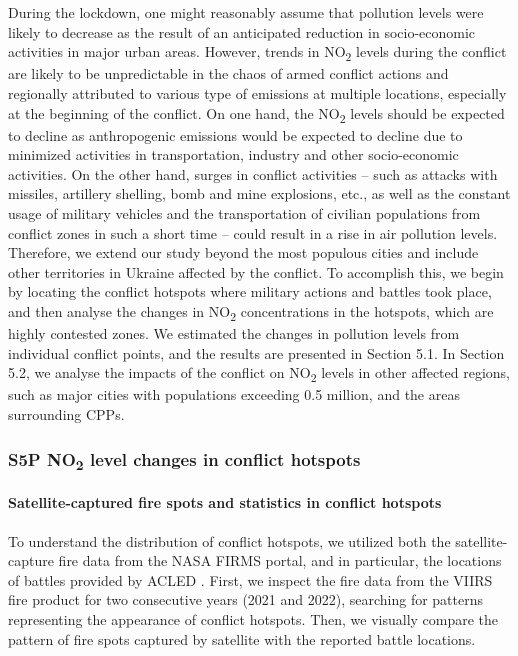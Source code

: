 During the lockdown, one might reasonably assume that pollution levels were likely to decrease as the result of an anticipated reduction in socio-economic activities in major urban areas. However, trends in NO\textsubscript{2} levels during the conflict are likely to be unpredictable in the chaos of armed conflict actions and regionally attributed to various type of emissions at multiple locations, especially at the beginning of the conflict. On one hand, the NO\textsubscript{2} levels should be expected to decline as anthropogenic emissions would be expected to decline due to minimized activities in transportation, industry and other socio-economic activities. On the other hand, surges in conflict activities – such as attacks with missiles, artillery shelling, bomb and mine explosions, etc., as well as the constant usage of military vehicles and the transportation of civilian populations from conflict zones in such a short time – could result in a rise in air pollution levels. Therefore, we extend our study beyond the most populous cities and include other territories in Ukraine affected by the conflict. To accomplish this, we begin by locating the conflict hotspots where military actions and battles took place, and then analyse the changes in NO\textsubscript{2} concentrations in the hotspots, which are highly contested zones. We estimated the changes in pollution levels from individual conflict points, and the results are presented in Section 5.1. In Section 5.2, we analyse the impacts of the conflict on NO\textsubscript{2} levels in other affected regions, such as major cities with populations exceeding 0.5 million, and the areas surrounding CPPs.\par
\subsubsection*{S5P NO\textsubscript{2} level changes in conflict hotspots}
\paragraph*{Satellite-captured fire spots and statistics in conflict hotspots}
To understand the distribution of conflict hotspots, we utilized both the satellite-capture fire data from the NASA FIRMS portal, and in particular, the locations of battles provided by ACLED \citep{raleigh2010introducing}. First, we inspect the fire data from the VIIRS fire product for two consecutive years (2021 and 2022), searching for patterns representing the appearance of conflict hotspots. Then, we visually compare the pattern of fire spots captured by satellite with the reported battle locations.\par

